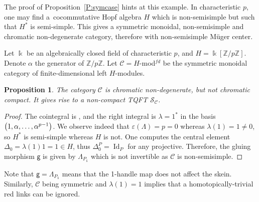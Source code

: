 \documentclass[10pt,a4paper]{amsart}
\newtheorem{proposition}{Proposition}
\numberwithin{equation}{section}
\newcommand{\gm}{{\mathsf{g}}}
\numberwithin{theorem}{section}
\numberwithin{proposition}{section}
\numberwithin{definition}{section}
\numberwithin{lemma}{section}
\numberwithin{corollary}{section}
\numberwithin{remark}{section}
\numberwithin{example}{section}
\newcommand{\cat}{\mathcal{C}}
\newcommand{\Z}{\ensuremath{\mathbb{Z}}}
\newcommand{\unit}{\ensuremath{\mathds{1}}}
\newcommand{\Id}{\operatorname{Id}}
\newcommand{\FK}{{\Bbbk}}
\newcommand{\TSkein}{{\mathscr{S}}}
\begin{document}
The proof of Proposition~\ref{P:symcase} hints at this example. In
characteristic $p$, one may find a~cocommutative Hopf algebra $H$
which is non-semisimple but such that $H^*$ is semi-simple. This gives
a symmetric monoidal, non-semisimple and chromatic non-degenerate
category, therefore with non-semisimple M\"uger center.
\begin{definition}
 Let $\FK$ be an algebraically closed field of characteristic $p$, and
 $H=\FK[\Z/p\Z]$. Denote $\alpha$ the generator of $\Z/p\Z$. Let
 $\cat = H$-mod$^{fd}$ be the symmetric monoidal category of finite-dimensional left $H$-modules.
\end{definition}
\begin{proposition}
 The category $\cat$ is chromatic non-degenerate, but not chromatic
 compact. It
 gives rise to a non-compact TQFT $\TSkein_\cat$.
\end{proposition}
\begin{proof}
 The cointegral is , and the right
 integral is $\lambda=1^*$ in the basis
 $\bigl(1,\alpha,\dots,\allowbreak \smash{\alpha^{p-1}\bigr)}$. We observe indeed that
 $\varepsilon(\Lambda)=p=0$ whereas $\lambda(1)=1\neq 0$, so $H^*$ is
 semi-simple whereas $H$ is not. One computes the central element
 $\Delta_0= \lambda(1)1=1\in H$, thus $\Delta_0^P=\Id_P$
 for any projective. Therefore, the gluing morphism $\gm$ is given by
 $\Lambda_{P_\unit}$ which is not invertible as $\cat$ is
 non-semisimple.
\end{proof}

Note that $\gm=\Lambda_{P_\unit}$ means that the 1-handle map does not
affect the skein. Similarly, $\cat$ being symmetric and $\lambda(1)=1$
implies that a homotopically-trivial red links can be ignored.
\end{document}
